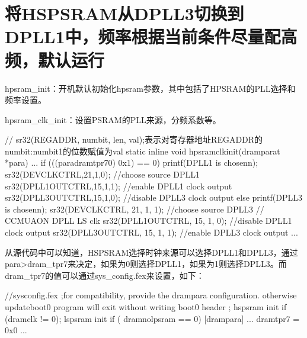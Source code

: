 \documentclass[letterpaper,10pt,english]{sphinxmanual}
\begin{document}
\section{将HS\sphinxhyphen{}PSRAM从DPLL3切换到DPLL1中，频率根据当前条件尽量配高频，默认运行}
\label{\detokenize{r128_u9a8c_u8bc1_u56fa_u4ef6/r128_u9a8c_u8bc1_u56fa_u4ef6_u5f00_u53d1_u6307_u5357:hs-psramdpll3dpll1}}
\sphinxAtStartPar
{}

\sphinxAtStartPar
{}

\sphinxAtStartPar
{}

\sphinxAtStartPar
hpsram\_init：开机默认初始化hpsram参数，其中包括了HPSRAM的PLL选择和频率设置。

\sphinxAtStartPar
hpsram\_clk\_init：设置PSRAM的PLL来源，分频系数等。

\begin{sphinxVerbatim}[commandchars=\\\{\}]
// sr32(REG\PYGZus{}ADDR, num\PYGZus{}bit, len, val);表示对寄存器地址REG\PYGZus{}ADDR的num\PYGZus{}bit:num\PYGZus{}bit\PYGZhy{}1的位数赋值为val
  static \PYGZus{}\PYGZus{}inline void hpsram\PYGZus{}clk\PYGZus{}init(\PYGZus{}\PYGZus{}dram\PYGZus{}para\PYGZus{}t *para)
\PYGZob{}
    ...
     if (((para\PYGZhy{}\PYGZgt{}dram\PYGZus{}tpr7\PYGZgt{}\PYGZgt{}0) \PYGZam{} 0x1) == 0) \PYGZob{}
        printf(\PYGZdq{}DPLL1 is chosen\PYGZbs{}n\PYGZdq{});
        sr32(DEV\PYGZus{}CLK\PYGZus{}CTRL,21,1,0);              //choose source DPLL1
        sr32(DPLL1\PYGZus{}OUT\PYGZus{}CTRL,15,1,1); //enable DPLL1 clock output
        sr32(DPLL3\PYGZus{}OUT\PYGZus{}CTRL,15,1,0); //disable DPLL3 clock output
    \PYGZcb{} else \PYGZob{}
        printf(\PYGZdq{}DPLL3 is chosen\PYGZbs{}n\PYGZdq{});
        sr32(DEV\PYGZus{}CLK\PYGZus{}CTRL, 21, 1, 1);  //choose source DPLL3
        // CCMU\PYGZus{}AON DPLL LS clk
        sr32(DPLL1\PYGZus{}OUT\PYGZus{}CTRL, 15, 1, 0); //disable DPLL1 clock output
        sr32(DPLL3\PYGZus{}OUT\PYGZus{}CTRL, 15, 1, 1); //enable DPLL3 clock output
    \PYGZcb{}
    ...
\PYGZcb{}
\end{sphinxVerbatim}

\sphinxAtStartPar
从源代码中可以知道，HSPSRAM选择时钟来源可以选择DPLL1和DPLL3，通过para\sphinxhyphen{}>dram\_tpr7来决定，如果为0则选择DPLL1，如果为1则选择DPLL3。而dram\_tpr7的值可以通过sys\_config.fex来设置，如下：

\begin{sphinxVerbatim}[commandchars=\\\{\}]
//sys\PYGZus{}config.fex
;for compatibility, provide the \PYGZsq{}dram\PYGZus{}para\PYGZsq{} configuration. otherwise update\PYGZus{}boot0 program will exit without writing boot0 header
; hspsram init if (dram\PYGZus{}clk != 0); lspsram init if ( dram\PYGZus{}no\PYGZus{}lpsram == 0)
[dram\PYGZus{}para]
...
dram\PYGZus{}tpr7      = 0x0
...
\end{sphinxVerbatim}
\end{document}
